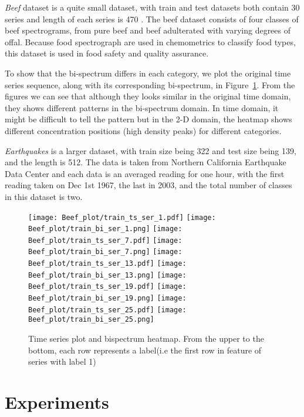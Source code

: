\documentclass[letterpaper,12pt]{article}
\begin{document}
\textit{Beef} dataset is a quite small dataset, with train and test datasets both contain 30 series and length of each series is 470 . The beef dataset consists of four classes of beef spectrograms, from pure beef and beef adulterated with varying degrees of offal. Because food spectrograph are used in chemometrics to classify food types, this dataset is used in food safety and quality assurance. 

To show that the bi-spectrum differs in each category, we plot the original time series sequence, along with its corresponding bi-spectrum, in Figure~\ref{fig-feature}. From the figures we can see that although they looks similar in the original time domain, they shows different patterns in the bi-spectrum domain.
In time domain, it might be difficult to tell the pattern but in the 2-D domain, the heatmap shows different concentration positions (high density peaks) for different categories.

\textit{Earthquakes} is a larger dataset, with train size being 322 and test size being 139, and the length is 512. The data is taken from Northern California Earthquake Data Center and each data is an averaged reading for one hour, with the first reading taken on Dec 1st 1967, the last in 2003, and the total number of classes in this dataset is two.

\begin{figure}[]
\centering
\texttt{[image: Beef\_plot/train\_ts\_ser\_1.pdf]}
\texttt{[image: Beef\_plot/train\_bi\_ser\_1.png]}
\texttt{[image: Beef\_plot/train\_ts\_ser\_7.pdf]}
\texttt{[image: Beef\_plot/train\_bi\_ser\_7.png]}
\texttt{[image: Beef\_plot/train\_ts\_ser\_13.pdf]}
\texttt{[image: Beef\_plot/train\_bi\_ser\_13.png]}
\texttt{[image: Beef\_plot/train\_ts\_ser\_19.pdf]}
\texttt{[image: Beef\_plot/train\_bi\_ser\_19.png]}
\texttt{[image: Beef\_plot/train\_ts\_ser\_25.pdf]}
\texttt{[image: Beef\_plot/train\_bi\_ser\_25.png]}
\caption{Time series plot and bispectrum heatmap. From the upper to the bottom, each row represents a label(i.e the first row in feature of series with label 1)}
\label{fig-feature}
\end{figure}


\section{Experiments}
\label{sec-experiments}
\end{document}
